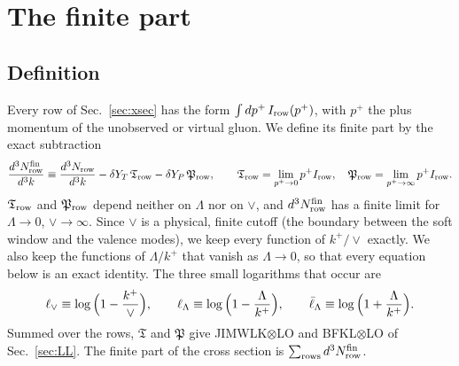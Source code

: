 \section{The finite part}\label{sec:finite}

\subsection{Definition}\label{sec:findef}

Every row of Sec.~\ref{sec:xsec} has the form $\int dp^+\,I_{\rm row}(p^+)$, with $p^+$ the plus momentum of the unobserved or virtual gluon. We define its finite part by the exact subtraction
\begin{equation}
\frac{d^3N^{\rm fin}_{\rm row}}{d^3k}\equiv\frac{d^3N_{\rm row}}{d^3k}-\delta Y_T\,\mathfrak T_{\rm row}-\delta Y_P\,\mathfrak P_{\rm row},\qquad \mathfrak T_{\rm row}=\lim_{p^+\to0}p^+I_{\rm row},\quad \mathfrak P_{\rm row}=\lim_{p^+\to\infty}p^+I_{\rm row}.
\label{eq:findef}
\end{equation}
$\mathfrak T_{\rm row}$ and $\mathfrak P_{\rm row}$ depend neither on $\Lambda$ nor on $\vee$, and $d^3N^{\rm fin}_{\rm row}$ has a finite limit for $\Lambda\to0$, $\vee\to\infty$. Since $\vee$ is a physical, finite cutoff (the boundary between the soft window and the valence modes), we keep every function of $k^+/\vee$ exactly. We also keep the functions of $\Lambda/k^+$ that vanish as $\Lambda\to0$, so that every equation below is an exact identity. The three small logarithms that occur are
\begin{equation}
\ell_{\vee}\equiv\log\Big(1-\frac{k^+}{\vee}\Big),\qquad \ell_{\Lambda}\equiv\log\Big(1-\frac{\Lambda}{k^+}\Big),\qquad \bar\ell_{\Lambda}\equiv\log\Big(1+\frac{\Lambda}{k^+}\Big).
\label{eq:smalllogs}
\end{equation}
Summed over the rows, $\mathfrak T$ and $\mathfrak P$ give JIMWLK$\otimes$LO and BFKL$\otimes$LO of Sec.~\ref{sec:LL}. The finite part of the cross section is $\sum_{\rm rows}d^3N^{\rm fin}_{\rm row}$.

